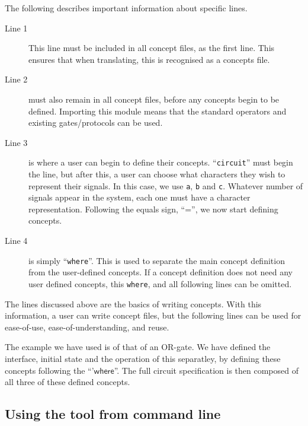 \documentclass[british,conference,compsoc]{IEEEtran}
\begin{document}
The following describes important information about specific lines.

\begin{description}
  \item [Line 1]
  This line must be included in all concept files, as the first line. This 
  ensures that when translating, this is recognised as a concepts file.
  
  \item [Line 2] must also remain in all concept files, before any concepts 
  begin to be defined. Importing this module means that the standard operators 
  and existing gates/protocols can be used. 
  
  \item [Line 3] is where a user can begin to define their concepts. 
  ``\texttt{circuit}'' must begin the line, but after this, a user can choose 
  what characters they wish to represent their signals. In this case, we use 
  \texttt{a}, \texttt{b} and \texttt{c}. Whatever number of signals appear in 
  the system, each one must have a character representation. Following the 
  equals sign, ``='', we now start defining concepts.
  
  \item [Line 4] is simply ``\texttt{where}''. This is used to separate the main
  concept definition from the user-defined concepts. If a concept definition 
  does not need any user defined concepts, this \texttt{where}, and all 
  following lines can be omitted.

\end{description}

\vspace{-1mm}

The lines discussed above are the basics of writing concepts. With this 
information, a user can write concept files, but the following lines can be 
used for ease-of-use, ease-of-understanding, and reuse. 

The example we have used is of that of an OR-gate. We have defined the 
interface, initial state and the operation of this separatley, by defining 
these concepts following the ``'$\mathsf{where}$''. The full circuit 
specification is then composed of all three of these defined concepts. 

\vspace{-3mm}

\subsection{Using the tool from command line}
\end{document}
